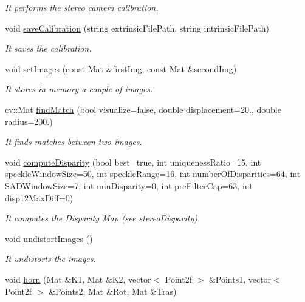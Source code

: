 \begin{DoxyCompactItemize}
\begin{DoxyCompactList}\small\item\em It performs the stereo camera calibration. \end{DoxyCompactList}\item 
void \hyperlink{classStereoCamera_a9f06cd4b170ad0ba45b681ee93d64851}{save\+Calibration} (string extrinsic\+File\+Path, string intrinsic\+File\+Path)
\begin{DoxyCompactList}\small\item\em It saves the calibration. \end{DoxyCompactList}\item 
void \hyperlink{classStereoCamera_adc36a2585c583219bddbb1c7fb0725df}{set\+Images} (const Mat \&first\+Img, const Mat \&second\+Img)
\begin{DoxyCompactList}\small\item\em It stores in memory a couple of images. \end{DoxyCompactList}\item 
cv\+::\+Mat \hyperlink{classStereoCamera_aeb1cf4e41058cd70c7df6b8c2511548d}{find\+Match} (bool visualize=false, double displacement=20., double radius=200.)
\begin{DoxyCompactList}\small\item\em It finds matches between two images. \end{DoxyCompactList}\item 
void \hyperlink{classStereoCamera_a79e986f2970bb2c5b5acd1ede65984aa}{compute\+Disparity} (bool best=true, int uniqueness\+Ratio=15, int speckle\+Window\+Size=50, int speckle\+Range=16, int number\+Of\+Disparities=64, int S\+A\+D\+Window\+Size=7, int min\+Disparity=0, int pre\+Filter\+Cap=63, int disp12\+Max\+Diff=0)
\begin{DoxyCompactList}\small\item\em It computes the Disparity Map (see stereo\+Disparity). \end{DoxyCompactList}\item 
void \hyperlink{classStereoCamera_a2751f357e5fabc7099303d45425208d7}{undistort\+Images} ()
\begin{DoxyCompactList}\small\item\em It undistorts the images. \end{DoxyCompactList}\item 
void \hyperlink{classStereoCamera_adf155975709fdbf09d3133899d074a02}{horn} (Mat \&K1, Mat \&K2, vector$<$ Point2f $>$ \&Points1, vector$<$ Point2f $>$ \&Points2, Mat \&Rot, Mat \&Tras)

\end{DoxyCompactItemize}
